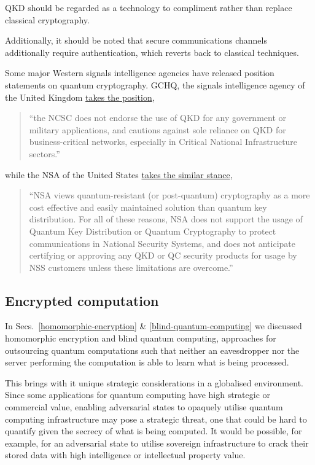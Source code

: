 QKD should be regarded as a technology to compliment rather than replace classical cryptography.

Additionally, it should be noted that secure communications channels additionally require authentication, which reverts back to classical techniques.

Some major Western signals intelligence agencies have released position statements on quantum cryptography. GCHQ, the signals intelligence agency of the United Kingdom \href{https://www.ncsc.gov.uk/whitepaper/quantum-security-technologies}{takes the position},
\begin{quote}
``the NCSC does not endorse the use of QKD for any government or military applications, and cautions against sole reliance on QKD for business-critical networks, especially in Critical National Infrastructure sectors.''
\end{quote}
while the NSA of the United States \href{https://www.nsa.gov/Cybersecurity/Quantum-Key-Distribution-QKD-and-Quantum-Cryptography-QC/
}{takes the similar stance},
\begin{quote}
``NSA views quantum-resistant (or post-quantum) cryptography as a more cost effective and easily maintained solution than quantum key distribution. For all of these reasons, NSA does not support the usage of Quantum Key Distribution or Quantum Cryptography to protect communications in National Security Systems, and does not anticipate certifying or approving any QKD or QC security products for usage by NSS customers unless these limitations are overcome.''
\end{quote}

\subsection{Encrypted computation}

In Secs.~\ref{homomorphic-encryption} \& \ref{blind-quantum-computing} we discussed homomorphic encryption and blind quantum computing, approaches for outsourcing quantum computations such that neither an eavesdropper nor the server performing the computation is able to learn what is being processed.

This brings with it unique strategic considerations in a globalised environment. Since some applications for quantum computing have high strategic or commercial value, enabling adversarial states to opaquely utilise quantum computing infrastructure may pose a strategic threat, one that could be hard to quantify given the secrecy of what is being computed. It would be possible, for example, for an adversarial state to utilise sovereign infrastructure to crack their stored data with high intelligence or intellectual property value.

